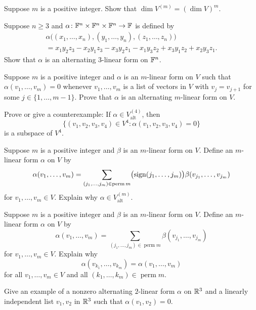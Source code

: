 \begin{exc}

\begin{exercise}
Suppose $m$ is a positive integer. Show that $\dim V^{(m)}=(\dim V)^m$.
\end{exercise}

\begin{exercise}
Suppose $n\ge3$ and $\alpha\colon\mathbb{F}^n\times\mathbb{F}^n\times\mathbb{F}^n\to\mathbb{F}$ is defined by
\begin{multline*}
\alpha\bigl((x_1,\dots,x_n),(y_1,\dots,y_n),(z_1,\dots,z_n)\bigr)\\
  = x_1y_2z_3-x_2y_1z_3-x_3y_2z_1-x_1y_3z_2+x_3y_1z_2+x_2y_3z_1.
\end{multline*}
Show that $\alpha$ is an alternating $3$-linear form on $\mathbb{F}^n$.
\end{exercise}

\begin{exercise}
Suppose $m$ is a positive integer and $\alpha$ is an $m$-linear form on $V$
such that $\alpha(v_1,\dots,v_m)=0$ whenever $v_1,\dots,v_m$ is a list of
vectors in $V$ with $v_j=v_{j+1}$ for some $j\in\{1,\dots,m-1\}$. Prove that
$\alpha$ is an alternating $m$-linear form on $V$.
\end{exercise}

\begin{exercise}
Prove or give a counterexample: If $\alpha\in V_{\mathrm{alt}}^{(4)}$, then
\[ \{(v_1,v_2,v_3,v_4)\in V^4 : \alpha(v_1,v_2,v_3,v_4)=0\} \]
is a subspace of $V^4$.
\end{exercise}

\begin{exercise}
Suppose $m$ is a positive integer and $\beta$ is an $m$-linear form on $V$.
Define an $m$-linear form $\alpha$ on $V$ by
\[ \alpha(v_1,\dots,v_m) = \sum_{(j_1,\dots,j_m)\in\operatorname{perm} m}
   \bigl(\operatorname{sign}(j_1,\dots,j_m)\bigr)\beta(v_{j_1},\dots,v_{j_m}) \]
for $v_1,\dots,v_m\in V$. Explain why $\alpha\in V_{\mathrm{alt}}^{(m)}$.
\end{exercise}

\begin{exercise}
Suppose $m$ is a positive integer and $\beta$ is an $m$-linear form on $V$.
Define an $m$-linear form $\alpha$ on $V$ by
\[ \alpha(v_1,\dots,v_m) = \sum_{(j_1,\dots,j_m)\in\operatorname{perm} m}
   \beta(v_{j_1},\dots,v_{j_m}) \]
for $v_1,\dots,v_m\in V$. Explain why
\[ \alpha(v_{k_1},\dots,v_{k_m}) = \alpha(v_1,\dots,v_m) \]
for all $v_1,\dots,v_m\in V$ and all $(k_1,\dots,k_m)\in\operatorname{perm} m$.
\end{exercise}

\begin{exercise}
Give an example of a nonzero alternating $2$-linear form $\alpha$ on $\mathbb{R}^3$
and a linearly independent list $v_1,v_2$ in $\mathbb{R}^3$ such that
$\alpha(v_1,v_2)=0$.
\end{exercise}
\end{exc}
